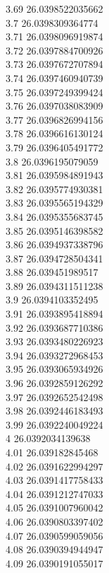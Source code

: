 {3.69	26.0398522035662\\
3.7	26.0398309364774\\
3.71	26.0398096919874\\
3.72	26.0397884700926\\
3.73	26.0397672707894\\
3.74	26.0397460940739\\
3.75	26.0397249399424\\
3.76	26.0397038083909\\
3.77	26.0396826994156\\
3.78	26.0396616130124\\
3.79	26.0396405491772\\
3.8	26.0396195079059\\
3.81	26.0395984891943\\
3.82	26.0395774930381\\
3.83	26.0395565194329\\
3.84	26.0395355683745\\
3.85	26.0395146398582\\
3.86	26.0394937338796\\
3.87	26.0394728504341\\
3.88	26.039451989517\\
3.89	26.0394311511238\\
3.9	26.0394103352495\\
3.91	26.0393895418894\\
3.92	26.0393687710386\\
3.93	26.0393480226923\\
3.94	26.0393272968453\\
3.95	26.0393065934926\\
3.96	26.0392859126292\\
3.97	26.0392652542498\\
3.98	26.0392446183493\\
3.99	26.0392240049224\\
4	26.0392034139638\\
4.01	26.039182845468\\
4.02	26.0391622994297\\
4.03	26.0391417758433\\
4.04	26.0391212747033\\
4.05	26.0391007960042\\
4.06	26.0390803397402\\
4.07	26.0390599059056\\
4.08	26.0390394944947\\
4.09	26.0390191055017\\
}
